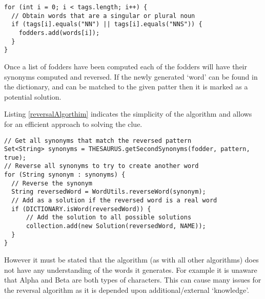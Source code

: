 \begin{lstlisting}[caption={Deducing all singular or plural nouns within the clue},
                   label=obtainFodders]  
for (int i = 0; i < tags.length; i++) {
  // Obtain words that are a singular or plural noun
  if (tags[i].equals("NN") || tags[i].equals("NNS")) {
    fodders.add(words[i]);
  }
}
\end{lstlisting}

Once a list of fodders have been computed each of the fodders will have their
synonyms computed and reversed. If the newly generated `word' can be found in 
the dictionary, and can be matched to the given patter then it is marked as a 
potential solution.

Listing \ref{reversalAlgorthim} indicates the simplicity of the algorithm and 
allows for an efficient approach to solving the clue.

\begin{lstlisting}[caption={Core reversal algorthim deducing possbile solutions},
                   label=reversalAlgorthim]  
// Get all synonyms that match the reversed pattern
Set<String> synonyms = THESAURUS.getSecondSynonyms(fodder, pattern, true);
// Reverse all synonyms to try to create another word
for (String synonym : synonyms) {
  // Reverse the synonym
  String reversedWord = WordUtils.reverseWord(synonym);
  // Add as a solution if the reversed word is a real word
  if (DICTIONARY.isWord(reversedWord)) {
      // Add the solution to all possible solutions
      collection.add(new Solution(reversedWord, NAME));
  }
}
\end{lstlisting}

However it must be stated that the algorithm (as with all other algorithms) does
not have any understanding of the words it generates. For example it is unaware
that Alpha and Beta are both types of characters. This can cause many issues for
the reversal algorithm as it is depended upon additional/external `knowledge'.
